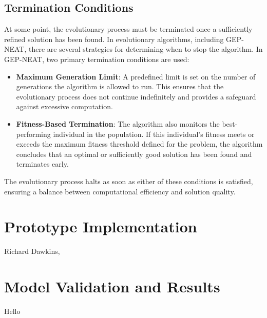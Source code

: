 \subsection{Termination Conditions}
At some point, the evolutionary process must be terminated once a sufficiently refined solution has been found. In evolutionary algorithms, including GEP-NEAT, there are several strategies for determining when to stop the algorithm. In GEP-NEAT, two primary termination conditions are used:
\begin{itemize}
	\item \textbf{Maximum Generation Limit}: A predefined limit is set on the number of generations the algorithm is allowed to run. This ensures that the evolutionary process does not continue indefinitely and provides a safeguard against excessive computation.
	\item \textbf{Fitness-Based Termination}: The algorithm also monitors the best-performing individual in the population. If this individual's fitness meets or exceeds the maximum fitness threshold defined for the problem, the algorithm concludes that an optimal or sufficiently good solution has been found and terminates early.
\end{itemize}

\parbreak\noindent The evolutionary process halts as soon as either of these conditions is satisfied, ensuring a balance between computational efficiency and solution quality.

\section{Prototype Implementation}\label{sec:gep_neat_protoype_implementation}
Richard Dawkins, 


\section{Model Validation and Results}\label{sec:gep_neat_model_validation}
Hello